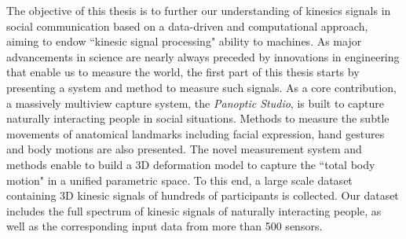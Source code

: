 

The objective of this thesis is to further our understanding of kinesics signals in social communication based on a data-driven and computational approach, aiming to endow ``kinesic signal processing" ability to machines. As major advancements in science are nearly always preceded by innovations in engineering that enable us to measure the world, the first part of this thesis starts by presenting a system and method to measure such signals. As a core contribution, a massively multiview capture system, the \emph{Panoptic Studio}, is built to capture naturally interacting people in social situations. Methods to measure the subtle movements of anatomical landmarks including facial expression, hand gestures and body motions are also presented. The novel measurement system and methods enable to build a 3D deformation model to capture the ``total body motion" in a unified parametric space. To this end, a large scale dataset containing 3D kinesic signals of hundreds of participants is collected. Our dataset includes the full spectrum of kinesic signals of naturally interacting people, as well as the corresponding input data from more than 500 sensors.%


